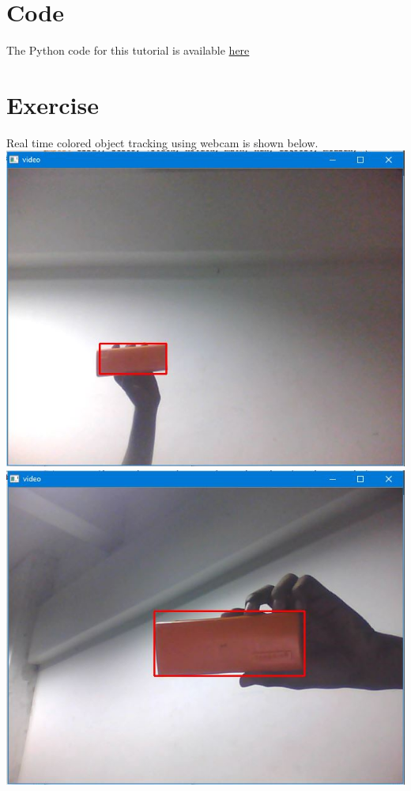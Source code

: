 \documentclass[11pt,a4paper]{article}
\begin{document}
	\section{Code}
    The Python code for this tutorial is available \href{https://github.com/eYSIP-2016/Object-Tracking-Camera/tree/master/Code/1.%20Colored%20Object%20Tracking%20using%20HSV}{here}
    \newpage
	\section{Exercise}
	Real time colored object tracking using webcam is shown below.
	\newline
	\newline
	\includegraphics[scale=0.7]{image1.jpg}
	\newline
	\includegraphics[scale=0.7]{image2.jpg}
	
\end{document}
